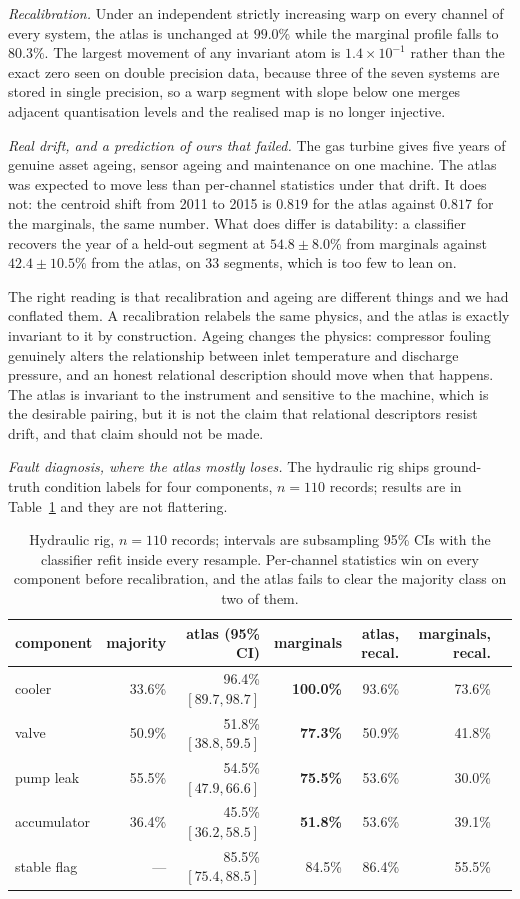 \documentclass[11pt]{article}
\begin{document}
\emph{Recalibration.} Under an independent strictly increasing warp on every
channel of every system, the atlas is unchanged at $99.0\%$ while the marginal
profile falls to $80.3\%$. The largest movement of any invariant atom is
$1.4\times10^{-1}$ rather than the exact zero seen on double precision data,
because three of the seven systems are stored in single precision, so a warp
segment with slope below one merges adjacent quantisation levels and the
realised map is no longer injective.

\emph{Real drift, and a prediction of ours that failed.} The gas turbine gives
five years of genuine asset ageing, sensor ageing and maintenance on one
machine. The atlas was expected to move less than per-channel statistics under
that drift. It does not: the centroid shift from 2011 to 2015 is $0.819$ for
the atlas against $0.817$ for the marginals, the same number. What does differ
is datability: a classifier recovers the year of a held-out segment at
$54.8\pm8.0\%$ from marginals against $42.4\pm10.5\%$ from the atlas, on 33
segments, which is too few to lean on.

The right reading is that recalibration and ageing are different things and we
had conflated them. A recalibration relabels the same physics, and the atlas is
exactly invariant to it by construction. Ageing changes the physics: compressor
fouling genuinely alters the relationship between inlet temperature and
discharge pressure, and an honest relational description should move when that
happens. The atlas is invariant to the instrument and sensitive to the machine,
which is the desirable pairing, but it is not the claim that relational
descriptors resist drift, and that claim should not be made.

\emph{Fault diagnosis, where the atlas mostly loses.} The hydraulic rig ships
ground-truth condition labels for four components, $n=110$ records; results
are in Table~\ref{tab:fault} and they are not flattering.

\begin{table}[t]
\centering
\small
\begin{tabular}{lrrrrrr}
\toprule
component & majority & atlas (95\% CI) & marginals & atlas, recal. & marginals, recal. \\
\midrule
cooler       & 33.6\% & 96.4\% $[89.7, 98.7]$ & \textbf{100.0\%} & 93.6\% & 73.6\% \\
valve        & 50.9\% & 51.8\% $[38.8, 59.5]$ & \textbf{77.3\%}  & 50.9\% & 41.8\% \\
pump leak    & 55.5\% & 54.5\% $[47.9, 66.6]$ & \textbf{75.5\%}  & 53.6\% & 30.0\% \\
accumulator  & 36.4\% & 45.5\% $[36.2, 58.5]$ & \textbf{51.8\%}  & 53.6\% & 39.1\% \\
stable flag  & ---    & 85.5\% $[75.4, 88.5]$ & 84.5\%           & 86.4\% & 55.5\% \\
\bottomrule
\end{tabular}
\caption{Hydraulic rig, $n=110$ records; intervals are subsampling 95\% CIs
with the classifier refit inside every resample. Per-channel statistics win on
every component before recalibration, and the atlas fails to clear the
majority class on two of them.}
\label{tab:fault}
\end{table}
\end{document}
